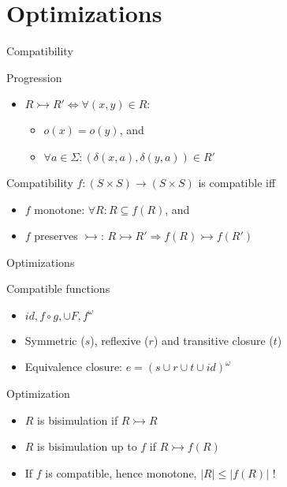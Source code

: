 \documentclass[compress]{beamer}
\begin{document}
\section{Optimizations}

\begin{frame}{Compatibility}
  \begin{block}{Progression}
    \begin{itemize}
      \item $R \rightarrowtail R' \Leftrightarrow \forall (x, y) \in R:$\\
        \begin{itemize}
          \item $o(x) = o(y)$, and
          \item $\forall a \in \Sigma: (\delta(x, a), \delta(y, a)) \in R'$
        \end{itemize}
    \end{itemize}
  \end{block}

  \begin{block}{Compatibility}
    $f : (S \times S) \to (S \times S)$ is compatible iff \\
    \begin{itemize}
      \item $f$ monotone: $\forall R: R \subseteq f(R)$, and
      \item $f$ preserves $\rightarrowtail$:
        $R \rightarrowtail R' \Rightarrow f(R) \rightarrowtail f(R')$
    \end{itemize}
  \end{block}
\end{frame}

\begin{frame}{Optimizations}
  \begin{block}{Compatible functions}
    \begin{itemize}
      \item $id, f \circ g, \cup F, f^\omega$
      \item Symmetric ($s$), reflexive ($r$) and transitive closure ($t$)
      \item Equivalence closure: $e = (s \cup r \cup t \cup id)^\omega$
    \end{itemize}
  \end{block}

  \begin{block}{Optimization}
    \begin{itemize}
      \item $R$ is bisimulation if $R \rightarrowtail R$
      \item $R$ is bisimulation up to $f$ if $R \rightarrowtail f(R)$
      \item If $f$ is compatible, hence monotone, $|R| \leq |f(R)|$ !
    \end{itemize}
  \end{block}
\end{frame}
\end{document}
